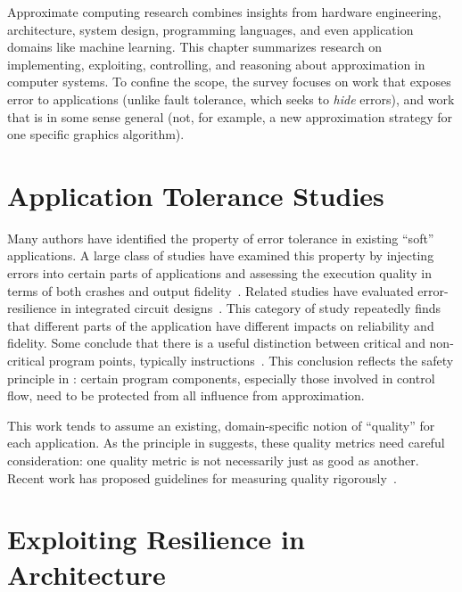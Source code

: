 Approximate computing research combines insights from hardware engineering,
architecture, system design, programming languages, and even application
domains like machine learning.
This chapter summarizes research on implementing, exploiting,
controlling, and reasoning about approximation in computer systems.
To confine the scope, the survey focuses on work that exposes error to
applications (unlike fault tolerance, which seeks to \emph{hide}
errors),
and work that is in some sense general (not, for example, a new approximation
strategy for one specific graphics algorithm).

\section{Application Tolerance Studies}
\label{sec:related:studies}

Many authors have identified the property of error tolerance in existing
``soft''
applications. A large class of studies have examined this property by
injecting errors into certain parts of applications and assessing the
execution quality in terms of both crashes and output fidelity~\cite{li06,
li07, li08, dekruijf-selse09, wong-selse06, palem-arcs, freton, besteffort,
yeh, thaker-iiswc06, efc, llfi, chippa-dac}.
Related
studies have evaluated error-resilience in
integrated circuit designs~\cite{breuer, scalable-effort-hardware}.
This category of study repeatedly finds that
different parts of the
application have different impacts on reliability and fidelity.
Some conclude
that there is a useful distinction between critical and non-critical program
points, typically instructions~\cite{palem-arcs, thaker-iiswc06, flikker,
llfi}.
This conclusion reflects
the safety principle in :
certain program components, especially those involved in control flow, need to
be protected from all influence from approximation.

This work tends to assume an existing,
domain-specific notion of ``quality'' for each
application.
As the principle in  suggests, these quality metrics
need careful consideration: one quality metric is not necessarily just as good
as another.
Recent work has proposed guidelines for measuring quality
rigorously~\cite{wddd-quality}.


\section{Exploiting Resilience in Architecture}

